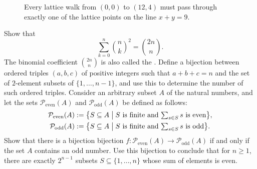 \begin{routine}
\begin{figure}[t]
    \caption[The Chu--Vandermonde identity]{Every lattice walk from $(0,0)$ to $(12,4)$ must pass through exactly one of the lattice points on the line $x+y=9$.}
    \label{figure:chu-vandermonde}
  \end{figure}
  \exercise Show that
  \begin{equation*}
    \sum_{k=0}^n \binom{n}{k}^2 = \binom{2n}{n}.
  \end{equation*}
  The binomial coefficient $\binom{2n}{n}$ is also called the .
  \exercise Define a bijection between ordered triples $(a,b,c)$ of positive integers such that $a+b+c=n$ and the set of $2$-element subsets of $\{1,\ldots,n-1\}$, and use this to determine the number of such ordered triples.
  \exercise Consider an arbitrary subset $A$ of the natural numbers, and let the sets $\mathcal{P}_{\mathrm{even}}(A)$ and $\mathcal{P}_{\mathrm{odd}}(A)$ be defined as follows:
  \begin{align*}
    \mathcal{P}_{\mathrm{even}}(A) & :=\big\{S\subseteq A\bigm| \text{$S$ is finite and }{\textstyle \sum_{s\in S}s}\text{ is even}\big\}, \\
    \mathcal{P}_{\mathrm{odd}}(A) & :=\big\{S\subseteq A\bigm| \text{$S$ is finite and }{\textstyle \sum_{s\in S}s}\text{ is odd}\big\}.
  \end{align*}
  Show that there is a bijection bijection $f:\mathcal{P}_{\mathrm{even}}(A)\to\mathcal{P}_{\mathrm{odd}}(A)$ if and only if the set $A$ contains an odd number. Use this bijection to conclude that for $n\geq 1$, there are exactly $2^{n-1}$ subsets $S\subseteq\{1,\ldots,n\}$ whose sum of elements is even.
\end{routine}

